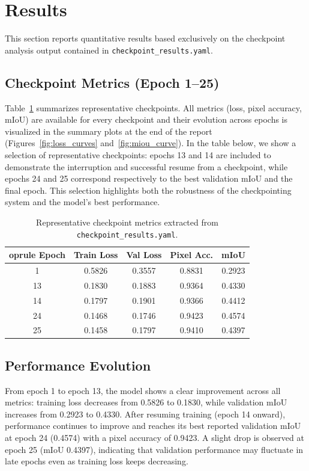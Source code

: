\documentclass[conference]{IEEEtran}
\begin{document}
\section{Results}
\label{sec:results}
This section reports quantitative results based exclusively on the checkpoint analysis output contained in \texttt{checkpoint\_results.yaml}.


\subsection{Checkpoint Metrics (Epoch 1--25)}
Table~\ref{tab:checkpoint_summary} summarizes representative checkpoints.
All metrics (loss, pixel accuracy, mIoU) are available for every checkpoint and their evolution across epochs is visualized in the summary plots at the end of the report (Figures~\ref{fig:loss_curves} and~\ref{fig:miou_curve}). In the table below, we show a selection of representative checkpoints: epochs 13 and 14 are included to demonstrate the interruption and successful resume from a checkpoint, while epochs 24 and 25 correspond respectively to the best validation mIoU and the final epoch. This selection highlights both the robustness of the checkpointing system and the model's best performance.

\begin{table}[ht]
\centering
\caption{Representative checkpoint metrics extracted from \texttt{checkpoint\_results.yaml}.}
\label{tab:checkpoint_summary}
\begin{tabular}{@{}ccccc@{}}
	oprule
Epoch & Train Loss & Val Loss & Pixel Acc. & mIoU \\
\midrule
1  & 0.5826 & 0.3557 & 0.8831 & 0.2923 \\
13 & 0.1830 & 0.1883 & 0.9364 & 0.4330 \\
14 & 0.1797 & 0.1901 & 0.9366 & 0.4412 \\
24 & 0.1468 & 0.1746 & 0.9423 & 0.4574 \\
25 & 0.1458 & 0.1797 & 0.9410 & 0.4397 \\
\bottomrule
\end{tabular}
\end{table}

\subsection{Performance Evolution}
From epoch 1 to epoch 13, the model shows a clear improvement across all metrics: training loss decreases from 0.5826 to 0.1830, while validation mIoU increases from 0.2923 to 0.4330. After resuming training (epoch 14 onward), performance continues to improve and reaches its best reported validation mIoU at epoch 24 (0.4574) with a pixel accuracy of 0.9423. A slight drop is observed at epoch 25 (mIoU 0.4397), indicating that validation performance may fluctuate in late epochs even as training loss keeps decreasing.
\end{document}
